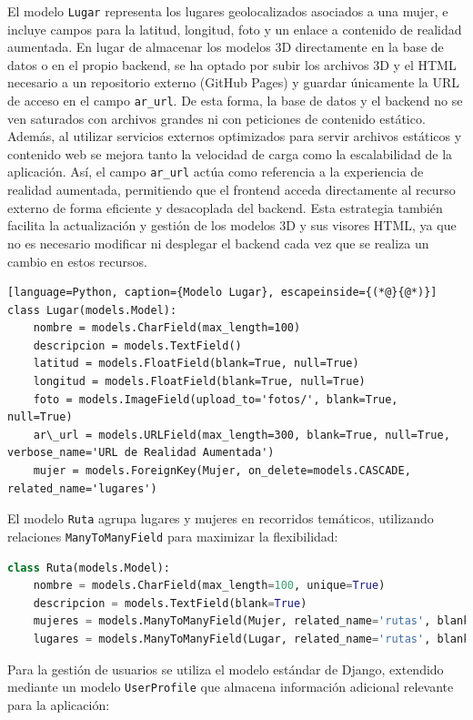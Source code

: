 El modelo \texttt{Lugar} representa los lugares geolocalizados asociados a una mujer, e incluye campos para la latitud, longitud, foto y un enlace a contenido de realidad aumentada.
En lugar de almacenar los modelos 3D directamente en la base de datos o en el propio backend, se ha optado por subir los archivos 3D y el HTML necesario a un repositorio externo (GitHub Pages) y guardar únicamente la URL de acceso en el campo \texttt{ar\_url}.
De esta forma, la base de datos y el backend no se ven saturados con archivos grandes ni con peticiones de contenido estático. Además, al utilizar servicios externos optimizados para servir archivos estáticos y contenido web se mejora tanto la velocidad de carga como la escalabilidad de la aplicación. Así, el campo \texttt{ar\_url} actúa como referencia a la experiencia de realidad aumentada, permitiendo que el frontend acceda directamente al recurso externo de forma eficiente y desacoplada del backend. Esta estrategia también facilita la actualización y gestión de los modelos 3D y sus visores HTML, ya que no es necesario modificar ni desplegar el backend cada vez que se realiza un cambio en estos recursos.

\begin{lstlisting}[language=Python, caption={Modelo Lugar}, escapeinside={(*@}{@*)}]
class Lugar(models.Model):
    nombre = models.CharField(max_length=100)
    descripcion = models.TextField()
    latitud = models.FloatField(blank=True, null=True)
    longitud = models.FloatField(blank=True, null=True)
    foto = models.ImageField(upload_to='fotos/', blank=True, null=True)
    ar\_url = models.URLField(max_length=300, blank=True, null=True, verbose_name='URL de Realidad Aumentada')
    mujer = models.ForeignKey(Mujer, on_delete=models.CASCADE, related_name='lugares')
\end{lstlisting}

El modelo \texttt{Ruta} agrupa lugares y mujeres en recorridos temáticos, utilizando relaciones \texttt{ManyToManyField} para maximizar la flexibilidad:

\begin{lstlisting}[language=Python, caption={Modelo Ruta}]
class Ruta(models.Model):
    nombre = models.CharField(max_length=100, unique=True)
    descripcion = models.TextField(blank=True)
    mujeres = models.ManyToManyField(Mujer, related_name='rutas', blank=True)
    lugares = models.ManyToManyField(Lugar, related_name='rutas', blank=True)
\end{lstlisting}

Para la gestión de usuarios se utiliza el modelo estándar de Django, extendido mediante un modelo \texttt{UserProfile} que almacena información adicional relevante para la aplicación:

